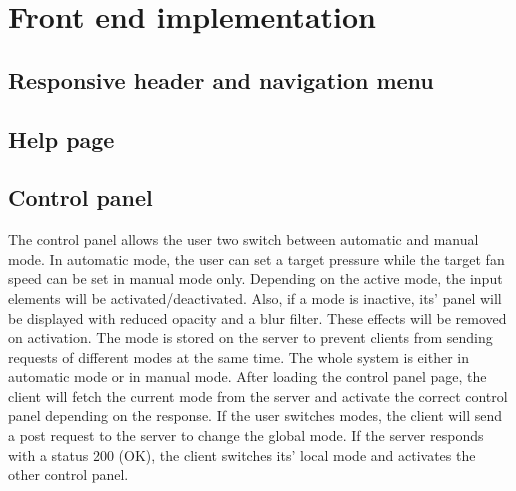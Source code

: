 \chapter{Front end implementation}
\label{ch:front_end_implementation}





\section{Responsive header and navigation menu}
\label{sec:responsive_header_and_navigation_menu}





\section{Help page}
\label{sec:help_page}





\section{Control panel}
\label{sec:control_panel}

The control panel allows the user two switch between automatic and manual mode. In automatic mode, the user can set a target pressure while the target fan speed can be set in manual mode only. Depending on the active mode, the input elements will be activated/deactivated.  Also, if a mode is inactive, its' panel will be displayed with reduced opacity and a blur filter. These effects will be removed on activation. The mode is stored on the server to prevent clients from sending requests of different modes at the same time. The whole system is either in automatic mode or in manual mode. After loading the control panel page, the client will fetch the current mode from the server and activate the correct control panel depending on the response. If the user switches modes, the client will send a post request to the server to change the global mode. If the server responds with a status 200 (OK), the client switches its' local mode and activates the other control panel.

